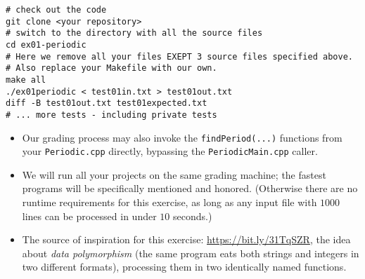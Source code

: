 \documentclass[11pt]{article}
\begin{document}
\begin{verbatim}
# check out the code
git clone <your repository>
# switch to the directory with all the source files
cd ex01-periodic
# Here we remove all your files EXEPT 3 source files specified above.
# Also replace your Makefile with our own.
make all
./ex01periodic < test01in.txt > test01out.txt
diff -B test01out.txt test01expected.txt
# ... more tests - including private tests
\end{verbatim}



\vspace{10pt}

{\small
\begin{itemize}
\item Our grading process may also invoke the {\tt findPeriod(...)} 
functions from your {\tt Periodic.cpp} directly, bypassing
the {\tt PeriodicMain.cpp} caller. 
\item We will run all your projects on the same grading machine; 
the fastest programs will be specifically mentioned and honored. 
(Otherwise there are no runtime requirements for this exercise, 
as long as any input file with $1000$ lines can be processed in under
$10$ seconds.)
\item The source of inspiration for this exercise: \url{https://bit.ly/31TqSZR}, the
idea about {\em data polymorphism} (the same program eats both 
strings and integers in two different formats), processing them 
in two identically named functions.
\end{itemize}
}
\end{document}

